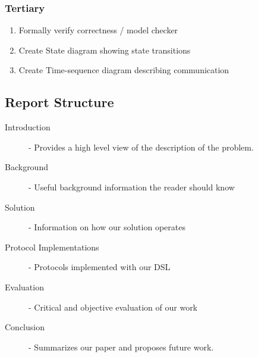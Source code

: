 \subsubsection{Tertiary}
\begin{enumerate}
    \item Formally verify correctness / model checker
    \item Create State diagram showing state transitions
    \item Create Time-sequence diagram describing communication
\end{enumerate}


\subsection{Report Structure}
\begin{description}
  \item[Introduction] - Provides a high level view of the description of the problem.
  \item[Background] - Useful background information the reader should know
  \item[Solution] - Information on how our solution operates 
  \item[Protocol Implementations] - Protocols implemented with our DSL
  \item[Evaluation] - Critical and objective evaluation of our work 
  \item[Conclusion] - Summarizes our paper and proposes future work.
\end{description}








